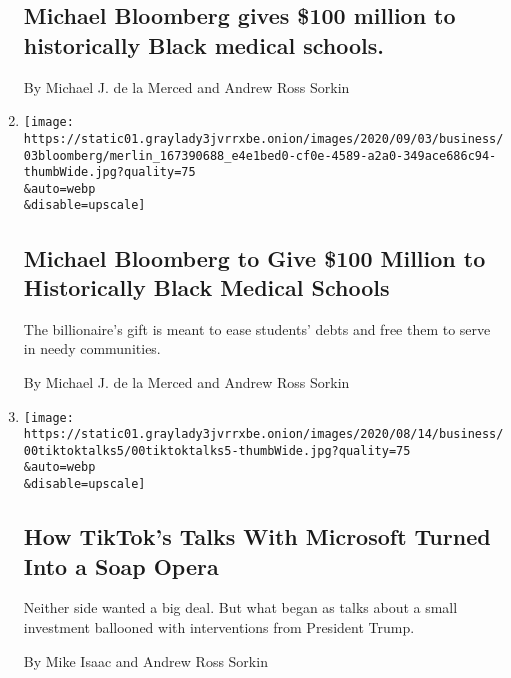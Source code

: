 \begin{enumerate}
  \hypertarget{michael-bloomberg-gives-100-million-to-historically-black-medical-schools}{%
  \subsection{Michael Bloomberg gives \$100 million to historically
  Black medical
  schools.}\label{michael-bloomberg-gives-100-million-to-historically-black-medical-schools}}

  By Michael J. de la Merced and Andrew Ross Sorkin
\item
  \href{/2020/09/03/business/dealbook/bloomberg-black-medical-schools-donation.html}{}

  \texttt{[image: https://static01.graylady3jvrrxbe.onion/images/2020/09/03/business/03bloomberg/merlin\_167390688\_e4e1bed0-cf0e-4589-a2a0-349ace686c94-thumbWide.jpg?quality=75\\\&auto=webp\\\&disable=upscale]}

  \hypertarget{michael-bloomberg-to-give-100-million-to-historically-black-medical-schools}{%
  \subsection{Michael Bloomberg to Give \$100 Million to Historically
  Black Medical
  Schools}\label{michael-bloomberg-to-give-100-million-to-historically-black-medical-schools}}

  The billionaire's gift is meant to ease students' debts and free them
  to serve in needy communities.

  By Michael J. de la Merced and Andrew Ross Sorkin
\item
  \href{/2020/08/26/technology/tiktoks-microsoft-deal-soap-opera-trump.html}{}

  \texttt{[image: https://static01.graylady3jvrrxbe.onion/images/2020/08/14/business/00tiktoktalks5/00tiktoktalks5-thumbWide.jpg?quality=75\\\&auto=webp\\\&disable=upscale]}

  \hypertarget{how-tiktoks-talks-with-microsoft-turned-into-a-soap-opera}{%
  \subsection{How TikTok's Talks With Microsoft Turned Into a Soap
  Opera}\label{how-tiktoks-talks-with-microsoft-turned-into-a-soap-opera}}

  Neither side wanted a big deal. But what began as talks about a small
  investment ballooned with interventions from President Trump.

  By Mike Isaac and Andrew Ross Sorkin


\end{enumerate}

